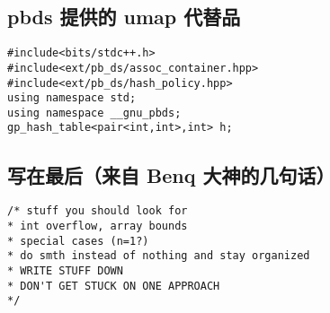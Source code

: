 \documentclass[12pt]{article}
\begin{document}


\newpage

\subsection{pbds 提供的 umap 代替品}

\begin{lstlisting}[style=C++]
#include<bits/stdc++.h>
#include<ext/pb_ds/assoc_container.hpp>
#include<ext/pb_ds/hash_policy.hpp>
using namespace std;
using namespace __gnu_pbds;
gp_hash_table<pair<int,int>,int> h;
\end{lstlisting}

\subsection{写在最后（来自 Benq 大神的几句话）}

\begin{lstlisting}[style=C++]
/* stuff you should look for
* int overflow, array bounds
* special cases (n=1?)
* do smth instead of nothing and stay organized
* WRITE STUFF DOWN
* DON'T GET STUCK ON ONE APPROACH
*/
\end{lstlisting}
\end{document}
